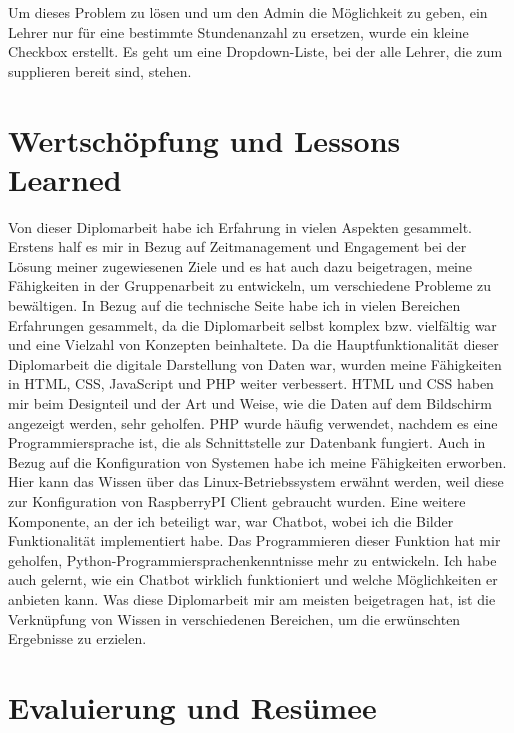 Um dieses Problem zu lösen und um den Admin die Möglichkeit zu geben, ein Lehrer nur für eine bestimmte Stundenanzahl zu ersetzen, wurde ein kleine Checkbox erstellt. Es geht um eine Dropdown-Liste, bei der alle Lehrer, die zum supplieren bereit sind, stehen. 

\section{Wertschöpfung und Lessons Learned}


Von dieser Diplomarbeit habe ich Erfahrung in vielen Aspekten gesammelt. Erstens half es mir in Bezug auf Zeitmanagement und Engagement bei der Lösung meiner zugewiesenen Ziele und es hat auch dazu beigetragen, meine Fähigkeiten in der Gruppenarbeit zu entwickeln, um verschiedene Probleme zu bewältigen. In Bezug auf die technische Seite habe ich in vielen Bereichen Erfahrungen gesammelt, da die Diplomarbeit selbst komplex bzw. vielfältig war und eine Vielzahl von Konzepten beinhaltete. Da die Hauptfunktionalität dieser Diplomarbeit die digitale Darstellung von Daten war, wurden meine Fähigkeiten in HTML, CSS, JavaScript und PHP weiter verbessert. HTML und CSS haben mir beim Designteil und der Art und Weise, wie die Daten auf dem Bildschirm angezeigt werden, sehr geholfen. PHP wurde häufig verwendet, nachdem es eine Programmiersprache ist, die als Schnittstelle zur Datenbank fungiert. Auch in Bezug auf die Konfiguration von Systemen habe ich meine Fähigkeiten erworben. Hier kann das Wissen über das Linux-Betriebssystem erwähnt werden, weil diese zur Konfiguration von RaspberryPI Client gebraucht wurden. Eine weitere Komponente, an der ich beteiligt war, war Chatbot, wobei ich die Bilder Funktionalität implementiert habe. Das Programmieren dieser Funktion hat mir geholfen, Python-Programmiersprachenkenntnisse mehr zu entwickeln. Ich habe auch gelernt, wie ein Chatbot wirklich funktioniert und welche Möglichkeiten er anbieten kann. Was diese Diplomarbeit mir am meisten beigetragen hat, ist die Verknüpfung von Wissen in verschiedenen Bereichen, um die erwünschten Ergebnisse zu erzielen.

\section{Evaluierung und Resümee}

